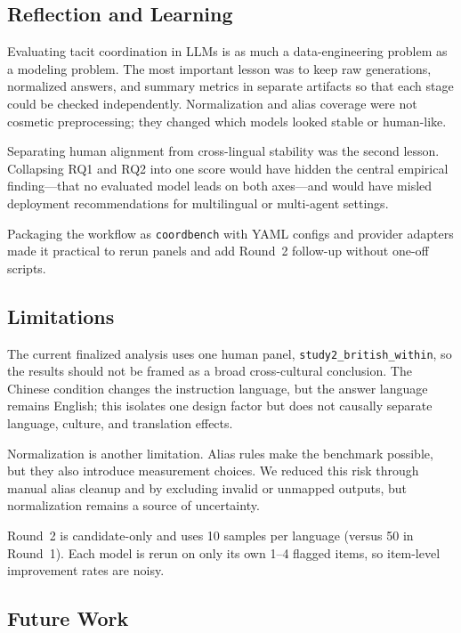 \documentclass[11pt]{article}
\begin{document}
\subsection{Reflection and Learning}
\label{sec:reflection}

Evaluating tacit coordination in LLMs is as much a data-engineering problem as a modeling problem. The most important lesson was to keep raw generations, normalized answers, and summary metrics in separate artifacts so that each stage could be checked independently. Normalization and alias coverage were not cosmetic preprocessing; they changed which models looked stable or human-like.

Separating human alignment from cross-lingual stability was the second lesson. Collapsing RQ1 and RQ2 into one score would have hidden the central empirical finding---that no evaluated model leads on both axes---and would have misled deployment recommendations for multilingual or multi-agent settings.

Packaging the workflow as \texttt{coordbench} with YAML configs and provider adapters made it practical to rerun panels and add Round~2 follow-up without one-off scripts.

\subsection{Limitations}
\label{sec:limitations}

The current finalized analysis uses one human panel, \texttt{study2\_british\_within}, so the results should not be framed as a broad cross-cultural conclusion. The Chinese condition changes the instruction language, but the answer language remains English; this isolates one design factor but does not causally separate language, culture, and translation effects.

Normalization is another limitation. Alias rules make the benchmark possible, but they also introduce measurement choices. We reduced this risk through manual alias cleanup and by excluding invalid or unmapped outputs, but normalization remains a source of uncertainty.

Round~2 is candidate-only and uses 10 samples per language (versus 50 in Round~1). Each model is rerun on only its own 1--4 flagged items, so item-level improvement rates are noisy.

\subsection{Future Work}
\label{sec:futurework}
\end{document}
